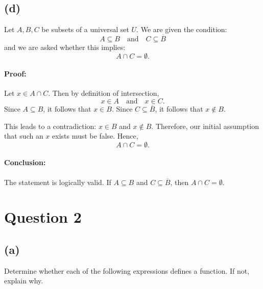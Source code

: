 \documentclass{article}
\begin{document}
\subsection*{(d)}

Let \( A, B, C \) be subsets of a universal set \( U \). We are given the condition:
\[
A \subseteq B \quad \text{and} \quad C \subseteq \overline{B}
\]
and we are asked whether this implies:
\[
A \cap C = \emptyset.
\]

\paragraph{Proof:}

Let \( x \in A \cap C \). Then by definition of intersection,
\[
x \in A \quad \text{and} \quad x \in C.
\]
Since \( A \subseteq B \), it follows that \( x \in B \).  
Since \( C \subseteq \overline{B} \), it follows that \( x \notin B \).  

This leads to a contradiction: \( x \in B \) and \( x \notin B \).  
Therefore, our initial assumption that such an \( x \) exists must be false.  
Hence,
\[
A \cap C = \emptyset.
\]

\paragraph{Conclusion:}  
The statement is logically valid. If \( A \subseteq B \) and \( C \subseteq \overline{B} \), then \( A \cap C = \emptyset \).

\section*{Question 2}

\subsection*{(a)}

Determine whether each of the following expressions defines a function. If not, explain why.
\end{document}
